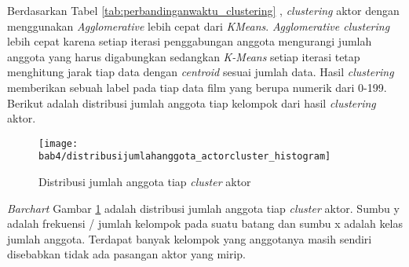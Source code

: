 Berdasarkan Tabel \ref{tab:perbandinganwaktu_clustering} , \textit{clustering} aktor dengan menggunakan \textit{Agglomerative} lebih cepat dari \textit{KMeans}. \textit{Agglomerative clustering} lebih cepat karena setiap iterasi penggabungan anggota mengurangi jumlah anggota yang harus digabungkan sedangkan \textit{K-Means} setiap iterasi tetap menghitung jarak tiap data dengan \textit{centroid} sesuai jumlah data. Hasil \textit{clustering} memberikan sebuah label pada tiap data film yang berupa numerik dari 0-199. Berikut adalah distribusi jumlah anggota tiap kelompok dari hasil \textit{clustering} aktor.


\begin{figure}[H]
	\centering  
	\texttt{[image: bab4/distribusijumlahanggota\_actorcluster\_histogram]}   
	\caption{Distribusi jumlah anggota tiap \textit{cluster} aktor}	\label{fig:membercountdistribution_agglo_clusteractor} 
\end{figure}

\textit{Barchart} Gambar \ref{fig:membercountdistribution_agglo_clusteractor} adalah distribusi jumlah anggota tiap \textit{cluster} aktor. Sumbu y adalah frekuensi / jumlah kelompok pada suatu batang dan sumbu x adalah kelas jumlah anggota. Terdapat banyak kelompok yang anggotanya masih sendiri disebabkan tidak ada pasangan aktor yang mirip.


